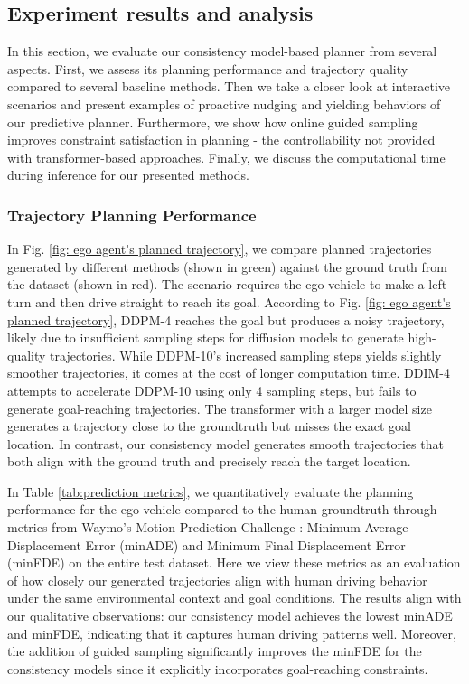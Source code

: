 \subsection{Experiment results and analysis}

In this section, we evaluate our consistency model-based planner from several aspects.
First, we assess its planning performance and trajectory quality compared to several baseline methods.
Then we take a closer look at interactive scenarios and present examples of proactive nudging and yielding behaviors of our predictive planner.
Furthermore, we show how online guided sampling improves constraint satisfaction in planning - the controllability not provided with transformer-based approaches.
Finally, we discuss the computational time during inference for our presented methods.


\subsubsection{\textbf{Trajectory Planning Performance}}

In Fig. \ref{fig: ego agent's planned trajectory}, we compare planned trajectories generated by different methods (shown in green) against the ground truth from the dataset (shown in red).
The scenario requires the ego vehicle to make a left turn and then drive straight to reach its goal.
According to Fig. \ref{fig: ego agent's planned trajectory}, 
DDPM-4 reaches the goal but produces a noisy trajectory, likely due to insufficient sampling steps for diffusion models to generate high-quality trajectories.
While DDPM-10's increased sampling steps yields slightly smoother trajectories, it comes at the cost of longer computation time.
DDIM-4 attempts to accelerate DDPM-10 using only 4 sampling steps, but fails to generate goal-reaching trajectories.
The transformer with a larger model size generates a trajectory close to the groundtruth but misses the exact goal location.
In contrast, our consistency model generates smooth trajectories that both align with the ground truth and precisely reach the target location.


In Table \ref{tab:prediction metrics}, we quantitatively evaluate the planning performance for the ego vehicle compared to the human groundtruth through metrics from Waymo's Motion Prediction Challenge \citep{waymo2024motion}: Minimum Average Displacement Error (minADE) and Minimum Final Displacement Error (minFDE) on the entire test dataset.
Here we view these metrics as an evaluation of how closely our generated trajectories align with human driving behavior under the same environmental context and goal conditions.
The results align with our qualitative observations: our consistency model achieves the lowest minADE and minFDE, indicating that it captures human driving patterns well.
Moreover, the addition of guided sampling significantly improves the minFDE for the consistency models since it explicitly incorporates goal-reaching constraints.

